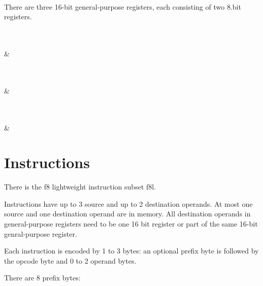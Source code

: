 \documentclass{book}
\begin{document}
\vspace{3mm}
\begin{bytefield}[bitwidth=0.025\linewidth]{16}
	 \\
\end{bytefield}

There are three 16-bit general-purpose registers, each consisting of two 8.bit registers.

\vspace{3mm}
\begin{bytefield}[bitwidth=0.025\linewidth]{16}
	 \\
	 \\
	 &
\end{bytefield}

\vspace{3mm}
\begin{bytefield}[bitwidth=0.025\linewidth]{16}
	 \\
	 \\
	 &
\end{bytefield}

\vspace{3mm}
\begin{bytefield}[bitwidth=0.025\linewidth]{16}
	 \\
	 \\
	 &
\end{bytefield}

\section{Instructions}

There is the f8 lightweight instruction subset f8l.

Instructions have up to 3 source and up to 2 destination operands. At most one source and one destination operand are in memory. All destination operands in general-purpose registers need to be one 16 bit register or part of the same 16-bit genral-purpose register.

Each instruction is encoded by 1 to 3 bytes: an optional prefix byte is followed by the opcode byte and 0 to 2 operand bytes.

There are 8 prefix bytes:
\end{document}
